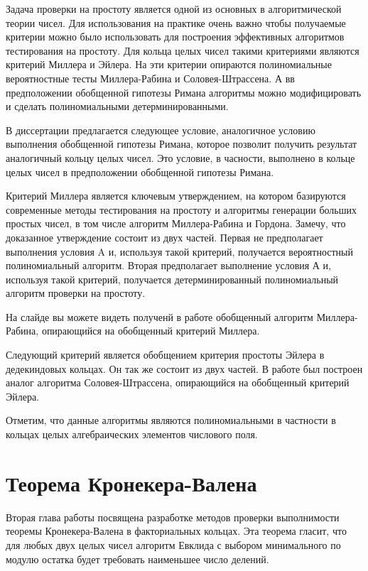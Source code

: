 \documentclass[a4paper,12pt]{article} %
\begin{document}
Задача проверки на простоту является одной из основных в алгоритмической теории чисел.
Для использования на практике очень важно чтобы получаемые критерии можно было использовать для построения эффективных алгоритмов тестирования на простоту.
Для кольца целых чисел такими критериями являются критерий Миллера и Эйлера.
На эти критерии опираются полиномиальные вероятностные тесты Миллера-Рабина и Соловея-Штрассена.
А вв предположении обобщенной гипотезы Римана алгоритмы можно модифицировать и сделать полиномиальными детерминированными.

В диссертации предлагается следующее условие, аналогичное условию выполнения обобщенной гипотезы Римана, которое позволит получить результат аналогичный кольцу целых чисел.
Это условие, в часности, выполнено в кольце целых чисел в предположении обобщенной гипотезы Римана.

Критерий Миллера является ключевым утверждением, на котором базируются современные методы тестирования на простоту и алгоритмы генерации больших простых чисел, в том числе алгоритм Миллера-Рабина и Гордона.
Замечу, что доказанное утверждение состоит из двух частей.
Первая не предполагает выполнения условия A и, используя такой критерий, получается вероятностный полиномиальный алгоритм.
Вторая предполагает выполнение условия А и, используя такой критерий, получается детерминированный полиномиальный алгоритм проверки на простоту.

На слайде вы можете видеть полученй в работе обобщенный алгоритм Миллера-Рабина, опирающийся на обобщенный критерий Миллера.

Следующий критерий является обобщением критерия простоты Эйлера в дедекиндовых кольцах.
Он так же состоит из двух частей.
В работе был построен аналог алгоритма Соловея-Штрассена, опирающийся на обобщенный критерий Эйлера.

Отметим, что данные алгоритмы являются полиномиальными в частности в кольцах целых алгебраических элементов числового поля.

\section{Теорема Кронекера-Валена}

Вторая глава работы посвящена разработке методов проверки выполнимости теоремы Кронекера-Валена в факториальных кольцах.
Эта теорема гласит, что для любых двух целых чисел алгоритм Евклида с выбором минимального по модулю остатка будет требовать наименьшее число делений.
\end{document}

